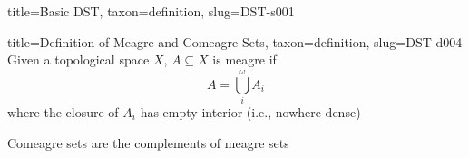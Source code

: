 \documentclass[a4paper]{article}
\begin{document}
\begin{tree}{title={Basic DST}, taxon={definition}, slug={DST-s001}}
\begin{tree}{title={Definition of Meagre and Comeagre Sets}, taxon={definition}, slug={DST-d004}}
Given a topological space \(X\), \(A \subseteq  X\) is meagre if \[A =  \bigcup _i^ \omega  A_i\] where the closure of \(A_i\) has empty interior (i.e., nowhere dense)\par{Comeagre sets are the complements of meagre sets}
\end{tree}

\end{tree}

\printbibliography
\end{document}
